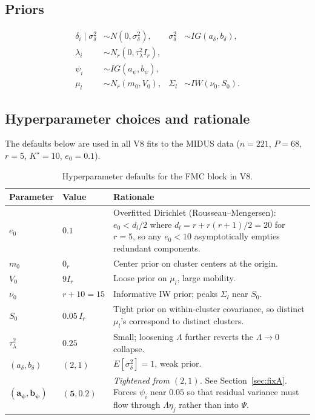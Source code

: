 \documentclass[11pt]{article}
\begin{document}
\subsection{Priors}

\begin{align}
\delta_i\mid\sigma_\delta^2 &\sim N(0,\sigma_\delta^2), &
\sigma_\delta^2 &\sim IG(a_\delta,b_\delta),\\
\lambda_i &\sim N_r(0,\tau_\lambda^2 I_r),\\
\psi_i &\sim IG(a_\psi,b_\psi),\\
\mu_l &\sim N_r(m_0,V_0), &
\Sigma_l &\sim IW(\nu_0,S_0).
\end{align}

\subsection{Hyperparameter choices and rationale}\label{sec:hyper-rationale}

The defaults below are used in all V8 fits to the MIDUS data ($n=221$, $P=68$, $r=5$, $K^\star=10$, $e_0=0.1$).

\begin{table}[h]
\centering
\begin{tabular}{lll}
\toprule
Parameter & Value & Rationale \\
\midrule
$e_0$           & $0.1$       & Overfitted Dirichlet (Rousseau--Mengersen): $e_0<d_l/2$ where $d_l=r+r(r+1)/2=20$ for $r=5$, so any $e_0<10$ asymptotically empties redundant components. \\
$m_0$           & $0_r$       & Center prior on cluster centers at the origin. \\
$V_0$           & $9I_r$      & Loose prior on $\mu_l$, large mobility. \\
$\nu_0$         & $r+10=15$   & Informative IW prior; peaks $\Sigma_l$ near $S_0$. \\
$S_0$           & $0.05\,I_r$ & Tight prior on within-cluster covariance, so distinct $\mu_l$'s correspond to distinct clusters. \\
$\tau_\lambda^2$ & $0.25$     & Small; loosening $\Lambda$ further reverts the $\Lambda\to 0$ collapse. \\
$(a_\delta,b_\delta)$ & $(2,1)$ & $E[\sigma_\delta^2]=1$, weak prior.\\
$\bm{(a_\psi,b_\psi)}$ & $\bm{(5,0.2)}$ & \emph{Tightened from $(2,1)$.} See Section~\ref{sec:fixA}. Forces $\psi_i$ near $0.05$ so that residual variance must flow through $\Lambda\eta_j$ rather than into $\Psi$. \\
\bottomrule
\end{tabular}
\caption{Hyperparameter defaults for the FMC block in V8.}
\end{table}
\end{document}
